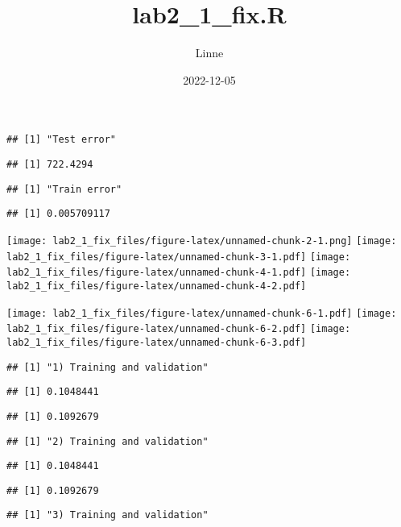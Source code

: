\documentclass[
]{article}
\title{lab2\_1\_fix.R}
\author{Linne}
\date{2022-12-05}
\begin{document}
\maketitle

\begin{verbatim}
## [1] "Test error"
\end{verbatim}

\begin{verbatim}
## [1] 722.4294
\end{verbatim}

\begin{verbatim}
## [1] "Train error"
\end{verbatim}

\begin{verbatim}
## [1] 0.005709117
\end{verbatim}

\texttt{[image: lab2\_1\_fix\_files/figure-latex/unnamed-chunk-2-1.png]}
\texttt{[image: lab2\_1\_fix\_files/figure-latex/unnamed-chunk-3-1.pdf]}
\texttt{[image: lab2\_1\_fix\_files/figure-latex/unnamed-chunk-4-1.pdf]}
\texttt{[image: lab2\_1\_fix\_files/figure-latex/unnamed-chunk-4-2.pdf]}

\texttt{[image: lab2\_1\_fix\_files/figure-latex/unnamed-chunk-6-1.pdf]}
\texttt{[image: lab2\_1\_fix\_files/figure-latex/unnamed-chunk-6-2.pdf]}
\texttt{[image: lab2\_1\_fix\_files/figure-latex/unnamed-chunk-6-3.pdf]}

\begin{verbatim}
## [1] "1) Training and validation"
\end{verbatim}

\begin{verbatim}
## [1] 0.1048441
\end{verbatim}

\begin{verbatim}
## [1] 0.1092679
\end{verbatim}

\begin{verbatim}
## [1] "2) Training and validation"
\end{verbatim}

\begin{verbatim}
## [1] 0.1048441
\end{verbatim}

\begin{verbatim}
## [1] 0.1092679
\end{verbatim}

\begin{verbatim}
## [1] "3) Training and validation"
\end{verbatim}
\end{document}
